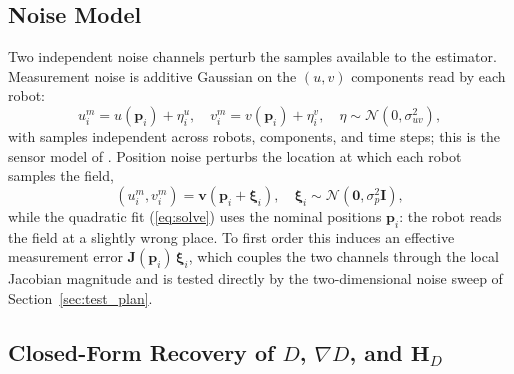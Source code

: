 \documentclass[lettersize,journal]{IEEEtran}
\begin{document}
\subsection{Noise Model}
\label{sec:noise_model}

Two independent noise channels perturb the samples available to the
estimator. Measurement noise is additive Gaussian on the $(u, v)$
components read by each robot:
\begin{equation}
    u_i^m = u(\mathbf{p}_i) + \eta_i^u, \quad
    v_i^m = v(\mathbf{p}_i) + \eta_i^v,
    \quad \eta \sim \mathcal{N}(0, \sigma_{uv}^2),
    \label{eq:meas_noise}
\end{equation}
with samples independent across robots, components, and time steps; this
is the sensor model of \cite{9}. Position noise perturbs the location at
which each robot samples the field,
\begin{equation}
    (u_i^m, v_i^m) = \mathbf{v}(\mathbf{p}_i + \boldsymbol{\xi}_i), \quad
    \boldsymbol{\xi}_i \sim \mathcal{N}(\mathbf{0}, \sigma_p^2 \mathbf{I}),
    \label{eq:pos_noise}
\end{equation}
while the quadratic fit (\ref{eq:solve}) uses the nominal positions
$\mathbf{p}_i$: the robot reads the field at a slightly wrong place. To
first order this induces an effective measurement error
$\mathbf{J}(\mathbf{p}_i)\,\boldsymbol{\xi}_i$, which couples the two
channels through the local Jacobian magnitude and is tested directly by
the two-dimensional noise sweep of Section~\ref{sec:test_plan}.

\subsection{Closed-Form Recovery of $D$, $\nabla D$, and $\mathbf{H}_D$}
\end{document}
